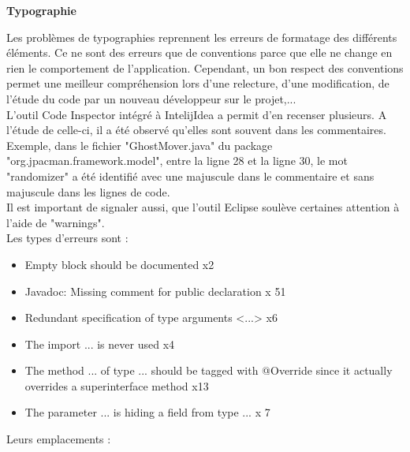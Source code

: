 \documentclass[12pt,a4paper,final]{article}
\newcommand{\smalltitle}[1]{\bigskip\large\textbf{#1}\par\normalsize\medskip}
\begin{document}
\smalltitle{Typographie}
Les problèmes de typographies reprennent les erreurs de formatage des différents éléments. Ce ne sont des erreurs que de conventions parce que elle ne change en rien le comportement de l'application. Cependant, un bon respect des conventions permet une meilleur compréhension lors d'une relecture, d'une modification, de l'étude du code par un nouveau développeur sur le projet,...\\
L'outil Code Inspector intégré à IntelijIdea a permit d'en recenser plusieurs. A l'étude de celle-ci, il a été observé qu'elles sont souvent dans les commentaires. Exemple, dans le fichier "GhostMover.java" du package "org.jpacman.framework.model", entre la ligne 28 et la ligne 30, le mot "randomizer" a été identifié avec une majuscule dans le commentaire et sans majuscule dans les lignes de code.\\
\vspace{3cm}
Il est important de signaler aussi, que l'outil Eclipse soulève certaines attention à l'aide de "warnings".\\
Les types d'erreurs sont : 
\begin{itemize}
\item Empty block should be documented x2
\item Javadoc: Missing comment for public declaration x 51
\item Redundant specification of type arguments <...> x6
\item The import ... is never used x4
\item The method ... of type ... should be tagged with @Override since it actually overrides a superinterface method x13
\item The parameter ... is hiding a field from type ... x 7
\end {itemize}
Leurs emplacements : \\
\end{document}
